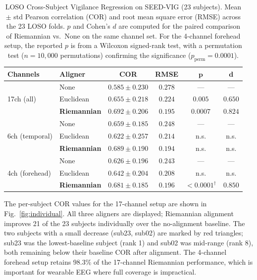 \documentclass[journal,twoside,web]{ieeecolor2}
\begin{document}
\begin{table}[!t]
\caption{LOSO Cross-Subject Vigilance Regression on SEED-VIG
(23 subjects). Mean $\pm$ std Pearson correlation (COR) and root mean
square error (RMSE) across the 23 LOSO folds. $p$ and Cohen's $d$ are
computed for the paired comparison of Riemannian vs.\ None on the same
channel set. For the 4-channel forehead setup, the reported $p$ is
from a Wilcoxon signed-rank test, with a permutation test
($n=10{,}000$ permutations) confirming the significance
($p_{\mathrm{perm}}=0.0001$).}
\label{tab:main}
\centering
\footnotesize
\setlength{\tabcolsep}{3pt}
\begin{tabular}{llcccc}
\toprule
\textbf{Channels} & \textbf{Aligner} & \textbf{COR} & \textbf{RMSE} & $\boldsymbol{p}$ & $\boldsymbol{d}$ \\
\midrule
\multirow{3}{*}{17ch (all)}
  & None       & $0.585\pm0.230$ & $0.278$ & ---    & ---   \\
  & Euclidean  & $0.655\pm0.218$ & $0.224$ & $0.005$ & $0.650$ \\
  & \textbf{Riemannian} & $\mathbf{0.692\pm0.206}$ & $\mathbf{0.195}$ & $\mathbf{0.0007}$ & $\mathbf{0.824}$ \\
\midrule
\multirow{3}{*}{6ch (temporal)}
  & None       & $0.659\pm0.185$ & $0.248$ & ---    & ---   \\
  & Euclidean  & $0.622\pm0.257$ & $0.214$ & n.s.   & n.s.  \\
  & \textbf{Riemannian} & $\mathbf{0.689\pm0.190}$ & $\mathbf{0.194}$ & n.s. & n.s. \\
\midrule
\multirow{3}{*}{4ch (forehead)}
  & None       & $0.626\pm0.196$ & $0.243$ & ---    & ---   \\
  & Euclidean  & $0.642\pm0.204$ & $0.208$ & n.s.   & n.s.  \\
  & \textbf{Riemannian} & $\mathbf{0.681\pm0.185}$ & $\mathbf{0.196}$ & $<0.0001^\dagger$ & $\mathbf{0.850}$ \\
\bottomrule
\end{tabular}
\end{table}

The per-subject COR values for the 17-channel setup are shown in
Fig.~\ref{fig:individual}. All three aligners are displayed; Riemannian
alignment improves 21 of the 23 subjects individually over the
no-alignment baseline. The two subjects with a small decrease
(sub23, sub02) are marked by red triangles; sub23 was the
lowest-baseline subject (rank 1) and sub02 was mid-range
(rank 8), both remaining below their baseline COR after
alignment. The 4-channel forehead setup
retains 98.3\% of the 17-channel Riemannian performance, which is
important for wearable EEG where full coverage is impractical.
\end{document}
